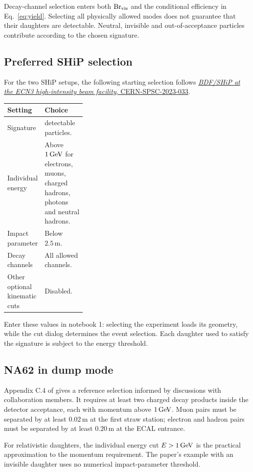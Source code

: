 Decay-channel selection enters both $\operatorname{Br}_{\mathrm{vis}}$ and the conditional efficiency in Eq.~\eqref{eq:yield}. Selecting all physically allowed modes does not guarantee that their daughters are detectable. Neutral, invisible and out-of-acceptance particles contribute according to the chosen signature.

\subsection{Preferred SHiP selection}\label{sec:ship}
For the two SHiP setups, the following starting selection follows \href{https://cds.cern.ch/record/2878604?ln=en}{\emph{BDF/SHiP at the ECN3 high-intensity beam facility}, CERN-SPSC-2023-033}.

\begin{tabularx}{\linewidth}{@{}P{0.32\linewidth}Y@{}}
\toprule
Setting & Choice \\
\midrule
Signature &  detectable particles. \\
Individual energy & Above $1\,\mathrm{GeV}$ for electrons, muons, charged hadrons, photons and neutral hadrons. \\
Impact parameter & Below $2.5\,\mathrm{m}$. \\
Decay channels & All allowed channels. \\
Other optional kinematic cuts & Disabled. \\
\bottomrule
\end{tabularx}

Enter these values in notebook 1: selecting the experiment loads its geometry, while the cut dialog determines the event selection. Each daughter used to satisfy the signature is subject to the energy threshold.

\subsection{NA62 in dump mode}
Appendix C.4 of  gives a reference selection informed by discussions with collaboration members. It requires at least two charged decay products inside the detector acceptance, each with momentum above $1\,\mathrm{GeV}$. Muon pairs must be separated by at least $0.02\,\mathrm{m}$ at the first straw station; electron and hadron pairs must be separated by at least $0.20\,\mathrm{m}$ at the ECAL entrance.

For relativistic daughters, the individual energy cut $E>1\,\mathrm{GeV}$ is the practical approximation to the momentum requirement. The paper's example with an invisible daughter uses no numerical impact-parameter threshold.

